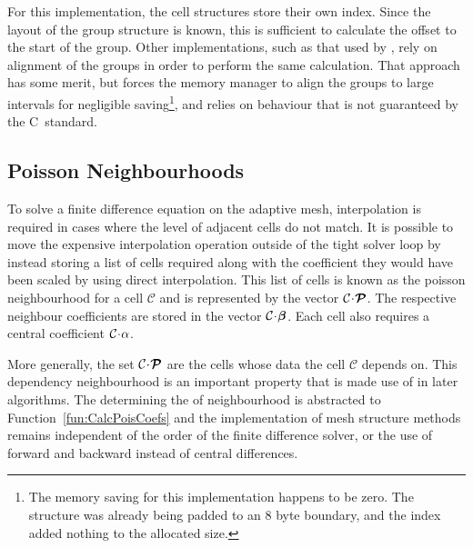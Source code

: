 \documentclass[twoside]{IIBproject}
\def\CC{{C\nolinebreak[4]\hspace{-.05em}\raisebox{.4ex}{\tiny\bf ++}}}
\newcommand{\vect} [1] {\bm{#1}}
\newcommand{\acc}{{\mkern 0.5mu\cdot\mkern 0.5mu}}
\numberwithin{figure}{section}
\begin{document}
        For this implementation, the cell structures store their own index. Since the layout of the group structure is known, this is sufficient to calculate the offset to the start of the group. Other implementations, such as that used by \cite{Yung2010}, rely on alignment of the groups in order to perform the same calculation. That approach has some merit, but forces the memory manager to align the groups to large intervals for negligible saving\footnote{The memory saving for this implementation happens to be zero. The structure was already being padded to an 8 byte boundary, and the index added nothing to the allocated size. }, and relies on behaviour that is not guaranteed by the \CC~standard.






    \subsection{Poisson Neighbourhoods} %
        \label{sec:poissonneighbours}

        To solve a finite difference equation on the adaptive mesh, interpolation is required in cases where the level of adjacent cells do not match. It is possible to move the expensive interpolation operation outside of the tight solver loop by instead storing a list of cells required along with the coefficient they would have been scaled by using direct interpolation. This list of cells is known as the poisson neighbourhood for a cell $\mathcal{C}$ and is represented by the vector $\mathcal{C}\acc\vect{\mathcal{P}}$. The respective neighbour coefficients are stored in the vector $\mathcal{C}\acc\vect{\beta}$. Each cell also requires a central coefficient $\mathcal{C}\acc\alpha$.

        More generally, the set $\mathcal{C}\acc\vect{\mathcal{P}}$ are the cells whose data the cell $\mathcal{C}$ depends on. This dependency neighbourhood is an important property that is made use of in later algorithms. The determining the of neighbourhood is abstracted to Function~\ref{fun:CalcPoisCoefs} and the implementation of mesh structure methods remains independent of the order of the finite difference solver, or the use of forward and backward instead of central differences.
\end{document}
